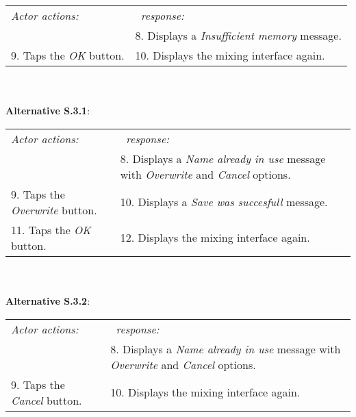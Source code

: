     \begin{tabular}{ p{} p{} }
  	\emph{Actor actions:} & \emph{\projectname\ response:} \\
           &  8. Displays a \emph{Insufficient memory} message. \\
	 9. Taps the \emph{OK} button. & 10. Displays the mixing interface again. \\
    \end{tabular}
    \\
    \\\textbf{Alternative S.3.1}: \\
    \begin{tabular}{ p{} p{} }
  	\emph{Actor actions:} & \emph{\projectname\ response:} \\
   & 8. Displays a \emph{Name already in use} message with \emph{Overwrite} and \emph{Cancel} options. \\
	 9. Taps the \emph{Overwrite} button. & 10. Displays a \emph{Save was succesfull} message. \\
	 11. Taps the \emph{OK} button. & 12. Displays the mixing interface again. \\
    \end{tabular}
    \\
    \\\textbf{Alternative S.3.2}: \\
    \begin{tabular}{ p{} p{} }
  	\emph{Actor actions:} & \emph{\projectname\ response:} \\
   & 8. Displays a \emph{Name already in use} message with \emph{Overwrite} and \emph{Cancel} options. \\
	 9. Taps the \emph{Cancel} button. & 10. Displays the mixing interface again. \\
    \end{tabular}
   
